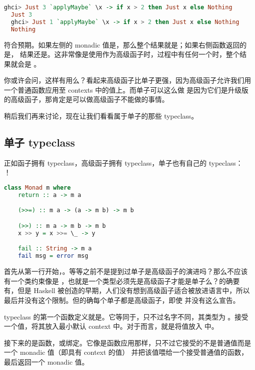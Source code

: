\documentclass[./main.tex]{subfiles}
\begin{document}
\begin{lstlisting}[language=Haskell]
  ghci> Just 3 `applyMaybe` \x -> if x > 2 then Just x else Nothing
  Just 3
  ghci> Just 1 `applyMaybe` \x -> if x > 2 then Just x else Nothing
  Nothing
\end{lstlisting}

符合预期。如果左侧的 monadic 值是，那么整个结果就是；如果右侧函数返回的是，
结果还是。这非常像是使用作为高级函子时，过程中有任何一个时，整个结果就会是
。

你或许会问，这样有用么？看起来高级函子比单子更强，因为高级函子允许我们用一个普通函数应用至 contexts 中的值上。而单子可以这么做
是因为它们是升级版的高级函子，那肯定是可以做高级函子不能做的事情。

稍后我们再来讨论，现在让我们看看属于单子的那些 typeclass。

\subsection*{单子 typeclass}

正如函子拥有 typeclass，高级函子拥有 typeclass，单子也有自己的 typeclass：
！

\begin{lstlisting}[language=Haskell]
  class Monad m where
    return :: a -> m a

    (>>=) :: m a -> (a -> m b) -> m b

    (>>) :: m a -> m b -> m b
    x >> y = x >>= \_ -> y

    fail :: String -> m a
    fail msg = error msg
\end{lstlisting}

首先从第一行开始，。等等之前不是提到过单子是高级函子的演进吗？那么不应该有一个类约束像是
，也就是一个类型必须先是高级函子才能是单子么？的确要有，但是 Haskell
被创造的早期，人们没有想到高级函子适合被放进语言中，所以最后并没有这个限制。但的确每个单子都是高级函子，即使
并没有这么宣告。

 typeclass 的第一个函数定义就是。它等同于，只不过名字不同，其类型为
。接受一个值，将其放入最小默认 context 中。对于而言，就是将值放入
中。

接下来的是函数\acode{>>=}，或绑定。它像是函数应用那样，只不过它接受的不是普通值而是一个 monadic 值（即具有 context 的值）
并把该值喂给一个接受普通值的函数，最后返回一个 monadic 值。
\end{document}
